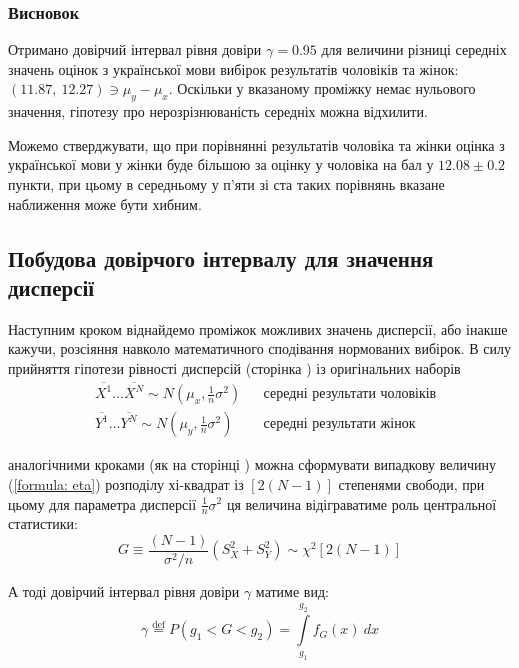 \subsubsection{Висновок}

Отримано довірчий інтервал рівня довіри $\gamma=0.95$ для величини різниці середніх значень 
оцінок з української мови вибірок результатів чоловіків та жінок: $(11.87,\ 12.27)\ni \mu_y-\mu_x$. Оскільки 
у вказаному проміжку немає нульового значення, гіпотезу про нерозрізнюваність середніх можна відхилити. 

Можемо стверджувати, що при порівнянні результатів чоловіка та жінки оцінка з української мови у жінки буде 
більшою за оцінку у чоловіка на бал у $12.08\pm 0.2$ пункти, при цьому в середньому у п'яти зі ста таких 
порівнянь вказане наближення може бути хибним.

\subsection{Побудова довірчого інтервалу для значення дисперсії}

Наступним кроком віднайдемо проміжок можливих значень дисперсії, або інакше кажучи, розсіяння навколо 
математичного сподівання нормованих вибірок. В силу прийняття гіпотези рівності дисперсій 
(сторінка \pageref{page: UKR dispersion hypothesis}) із оригінальних наборів
\begin{align*}
    &\overline{X^1}\ldots \overline{X^N}\sim N(\mu_x,\tfrac{1}{n}\sigma^2) && \text{середні результати чоловіків} \\
    &\overline{Y^1}\ldots \overline{Y^N}\sim N(\mu_y,\tfrac{1}{n}\sigma^2) && \text{середні результати жінок}
\end{align*}

аналогічними кроками (як на сторінці \pageref{page: seaching central statistic}) можна сформувати випадкову 
величину (\ref{formula: eta}) розподілу хі-квадрат із $\left[ 2(N-1) \right]$ степенями свободи, при цьому 
для параметра дисперсії $\frac{1}{n}\sigma^2$ ця величина відіграватиме роль центральної статистики:
\begin{equation}
    G\equiv\frac{(N-1)}{\sigma^2/n}\left( S_X^2+S_Y^2 \right)\sim \chi^2\left[ 2(N-1) \right]
\end{equation}

А тоді довірчий інтервал рівня довіри $\gamma$ матиме вид:
\begin{equation}
    \gamma \overset{\mathrm{def}}{=} P(g_1<G<g_2)=\int\limits_{g_1}^{g_2}f_G(x)\ dx \label{formula: gamma chi interval}
\end{equation}

